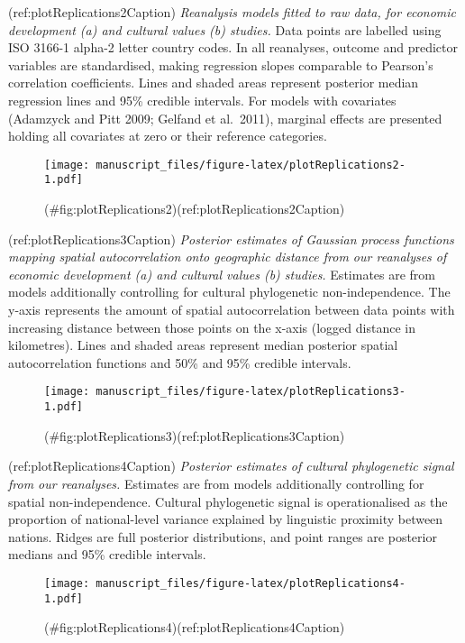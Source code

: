 \begin{appendix}
\newpage

(ref:plotReplications2Caption) \emph{Reanalysis models fitted to raw
data, for economic development (a) and cultural values (b) studies.}
Data points are labelled using ISO 3166-1 alpha-2 letter country codes.
In all reanalyses, outcome and predictor variables are standardised,
making regression slopes comparable to Pearson's correlation
coefficients. Lines and shaded areas represent posterior median
regression lines and 95\% credible intervals. For models with covariates
(Adamzyck and Pitt 2009; Gelfand et al.~2011), marginal effects are
presented holding all covariates at zero or their reference categories.

\begin{figure}
\centering
\texttt{[image: manuscript\_files/figure-latex/plotReplications2-1.pdf]}
\caption{(\#fig:plotReplications2)(ref:plotReplications2Caption)}
\end{figure}

\newpage

(ref:plotReplications3Caption) \emph{Posterior estimates of Gaussian
process functions mapping spatial autocorrelation onto geographic
distance from our reanalyses of economic development (a) and cultural
values (b) studies.} Estimates are from models additionally controlling
for cultural phylogenetic non-independence. The y-axis represents the
amount of spatial autocorrelation between data points with increasing
distance between those points on the x-axis (logged distance in
kilometres). Lines and shaded areas represent median posterior spatial
autocorrelation functions and 50\% and 95\% credible intervals.

\begin{figure}
\centering
\texttt{[image: manuscript\_files/figure-latex/plotReplications3-1.pdf]}
\caption{(\#fig:plotReplications3)(ref:plotReplications3Caption)}
\end{figure}

\newpage

(ref:plotReplications4Caption) \emph{Posterior estimates of cultural
phylogenetic signal from our reanalyses.} Estimates are from models
additionally controlling for spatial non-independence. Cultural
phylogenetic signal is operationalised as the proportion of
national-level variance explained by linguistic proximity between
nations. Ridges are full posterior distributions, and point ranges are
posterior medians and 95\% credible intervals.

\begin{figure}
\centering
\texttt{[image: manuscript\_files/figure-latex/plotReplications4-1.pdf]}
\caption{(\#fig:plotReplications4)(ref:plotReplications4Caption)}
\end{figure}


\end{appendix}
